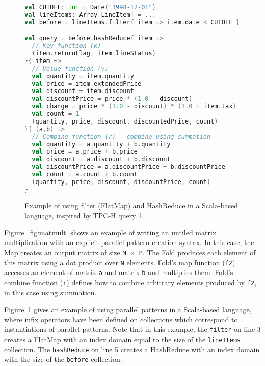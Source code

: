 \begin{figure}\centering
\begin{lstlisting}[language=Scala]
val CUTOFF: Int = Date("1998-12-01")
val lineItems: Array[LineItem] = ...
val before = lineItems.filter{ item => item.date < CUTOFF }

val query = before.hashReduce{ item =>
  // Key function (k)
  (item.returnFlag, item.lineStatus)
}{ item =>
  // Value function (v)
  val quantity = item.quantity
  val price = item.extendedPrice
  val discount = item.discount
  val discountPrice = price * (1.0 - discount)
  val charge = price * (1.0 - discount) * (1.0 + item.tax)
  val count = 1
  (quantity, price, discount, discountedPrice, count)
}{ (a,b) =>
  // Combine function (r) - combine using summation
  val quantity = a.quantity + b.quantity
  val price = a.price + b.price
  val discount = a.discount + b.discount
  val discountPrice = a.discountPrice + b.discountPrice
  val count = a.count + b.count
  (quantity, price, discount, discountPrice, count)
}
\end{lstlisting}
\vspace{-10pt}
\caption{Example of using filter (FlatMap) and HashReduce in a Scala-based language, inspired by TPC-H query 1. }
\label{fig:tpchq1}
\vspace{-5pt}
\end{figure}

Figure~\ref{fig:matmult} shows an example of writing an untiled matrix
multiplication with an explicit parallel pattern creation syntax. In
this case, the Map creates an output matrix of size \texttt{M}~$\times$~\texttt{P}. 
The Fold produces each element of this matrix using a dot product over \texttt{N} elements.
Fold's map function (\texttt{f2}) accesses an element of matrix \texttt{a} and matrix \texttt{b} and multiplies them.
Fold's combine function (\texttt{r}) defines how to combine arbitrary elements produced by \texttt{f2}, in this case using summation.


Figure~\ref{fig:tpchq1} gives an example of using parallel patterns in a Scala-based language, where infix operators have been
defined on collections which correspond to instantiations of parallel patterns. Note that in this example, the \texttt{filter} on line 3 creates
a FlatMap with an index domain equal to the size of the \texttt{lineItems} collection. The \texttt{hashReduce} on line 5 creates a HashReduce with an index domain with the size of the \texttt{before} collection.



